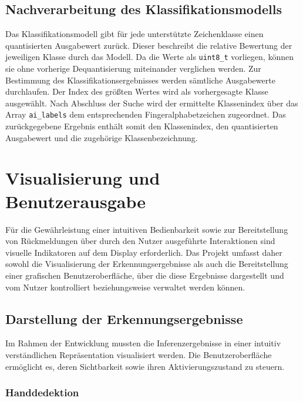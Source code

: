 \subsection{Nachverarbeitung des Klassifikationsmodells}\label{sub:klassifikation-nachverarbeitung}

Das Klassifikationsmodell gibt für jede unterstützte Zeichenklasse einen quantisierten Ausgabewert zurück. Dieser beschreibt die relative Bewertung der jeweiligen Klasse durch das Modell. Da die Werte als \texttt{uint8\_t} vorliegen, können sie ohne vorherige Dequantisierung miteinander verglichen werden. Zur Bestimmung des Klassifikationsergebnisses werden sämtliche Ausgabewerte durchlaufen. Der Index des größten Wertes wird als vorhergesagte Klasse ausgewählt. Nach Abschluss der Suche wird der ermittelte Klassenindex über das Array \texttt{ai\_labels} dem entsprechenden Fingeralphabetzeichen zugeordnet. Das zurückgegebene Ergebnis enthält somit den Klassenindex, den quantisierten Ausgabewert und die zugehörige Klassenbezeichnung.

\section{Visualisierung und Benutzerausgabe}\label{sec:visualisierung}

Für die Gewährleistung einer intuitiven Bedienbarkeit sowie zur Bereitstellung von Rückmeldungen über durch den Nutzer ausgeführte Interaktionen sind visuelle Indikatoren auf dem Display erforderlich. Das Projekt umfasst daher sowohl die Visualisierung der Erkennungsergebnisse als auch die Bereitstellung einer grafischen Benutzeroberfläche, über die diese Ergebnisse dargestellt und vom Nutzer kontrolliert beziehungsweise verwaltet werden können.

\subsection{Darstellung der Erkennungsergebnisse}\label{sub:darstellung-ergebnisse}

Im Rahmen der Entwicklung mussten die Inferenzergebnisse in einer intuitiv verständlichen Repräsentation visualisiert werden. Die Benutzeroberfläche ermöglicht es, deren Sichtbarkeit sowie ihren Aktivierungszustand zu steuern.

\subsubsection{Handdedektion}\label{ssub:darstellung-palm}


